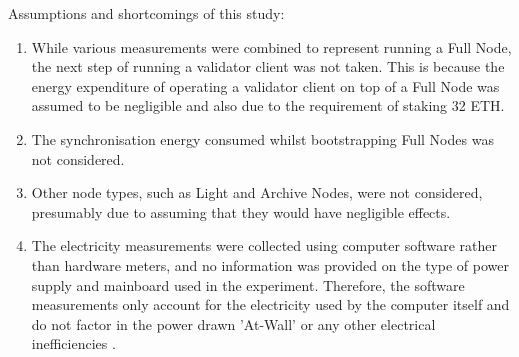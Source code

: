 Assumptions and shortcomings of this study:
\begin{enumerate}
    \item While various measurements were combined to represent running a Full Node, the next step of running a validator client was not taken. This is because the energy expenditure of operating a validator client on top of a Full Node was assumed to be negligible and also due to the requirement of staking 32 ETH.
    
    \item The synchronisation energy consumed whilst bootstrapping Full Nodes was not considered.
    
    \item Other node types, such as Light and Archive Nodes, were not considered, presumably due to assuming that they would have negligible effects.

    \item The electricity measurements were collected using computer software rather than hardware meters, and no information was provided on the type of power supply and mainboard used in the experiment. Therefore, the software measurements only account for the electricity used by the computer itself and do not factor in the power drawn 'At-Wall' or any other electrical inefficiencies \cite{Warkozek2012ACenters}.
\end{enumerate}
 








